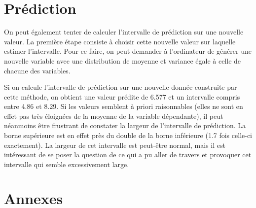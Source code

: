 \documentclass[11pt,a4paper]{article}
\begin{document}
\section{Prédiction}

On peut également tenter de calculer l'intervalle de prédiction sur une nouvelle valeur. La première étape consiste à choisir cette nouvelle valeur sur laquelle estimer l'intervalle. Pour ce faire, on peut demander à l'ordinateur de générer une nouvelle variable avec une distribution de moyenne et variance égale à celle de chacune des variables. 

Si on calcule l'intervalle de prédiction sur une nouvelle donnée construite par cette méthode, on obtient une valeur prédite de 6.577 et un intervalle compris entre 4.86 et 8.29. Si les valeurs semblent à priori raisonnables (elles ne sont en effet pas très éloignées de la moyenne de la variable dépendante), il peut néanmoins être frustrant de constater la largeur de l'intervalle de prédiction. La borne supérieure est en effet près du double de la borne inférieure (1.7 fois celle-ci exactement). La largeur de cet intervalle est peut-être normal, mais il est intéressant de se poser la question de ce qui a pu aller de travers et provoquer cet intervalle qui semble excessivement large.

\section{Annexes}
\appendix
\end{document}
